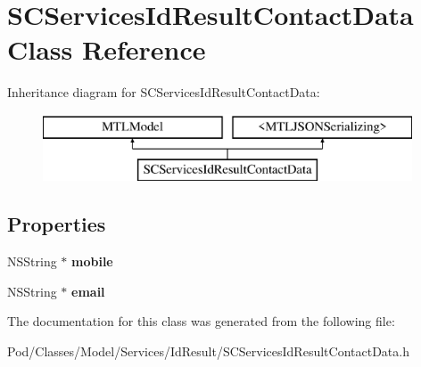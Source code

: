 \hypertarget{interface_s_c_services_id_result_contact_data}{}\section{S\+C\+Services\+Id\+Result\+Contact\+Data Class Reference}
\label{interface_s_c_services_id_result_contact_data}
Inheritance diagram for S\+C\+Services\+Id\+Result\+Contact\+Data\+:\begin{figure}[H]
\begin{center}
\leavevmode
\includegraphics[height=2.000000cm]{interface_s_c_services_id_result_contact_data}
\end{center}
\end{figure}
\subsection*{Properties}
\begin{DoxyCompactItemize}
\item 
N\+S\+String $\ast$ {\bfseries mobile}\hypertarget{interface_s_c_services_id_result_contact_data_aff55874e2937fb7b24287ec4840d5b25}{}\label{interface_s_c_services_id_result_contact_data_aff55874e2937fb7b24287ec4840d5b25}

\item 
N\+S\+String $\ast$ {\bfseries email}\hypertarget{interface_s_c_services_id_result_contact_data_a776f9907cca85e70b73d068323a8c916}{}\label{interface_s_c_services_id_result_contact_data_a776f9907cca85e70b73d068323a8c916}

\end{DoxyCompactItemize}


The documentation for this class was generated from the following file\+:\begin{DoxyCompactItemize}
\item 
Pod/\+Classes/\+Model/\+Services/\+Id\+Result/S\+C\+Services\+Id\+Result\+Contact\+Data.\+h\end{DoxyCompactItemize}
